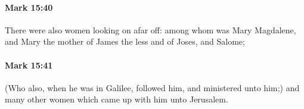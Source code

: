 		\paragraph{Mark 15:40} %
			\label{MARK-15-40}

			There were also women looking on afar off: among whom was Mary Magdalene, and Mary the mother of James the less and of Joses, and Salome;

			\begin{framed}
			\scriptsize
				\begin{compactdesc}
					\item[SBLG] 
				\end{compactdesc}
			\end{framed}

		\paragraph{Mark 15:41} %
			\label{MARK-15-41}

			(Who also, when he was in Galilee, followed him, and ministered unto him;) and many other women which came up with him unto Jerusalem.

